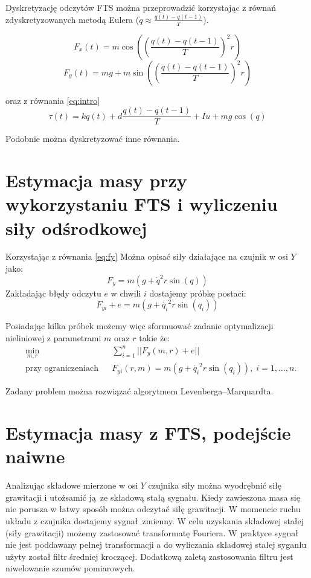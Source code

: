 \documentclass[a4paper, 10pt]{article}
\begin{document}
Dyskretyzację odczytów FTS można przeprowadzić korzystając z równań zdyskretyzowanych metodą Eulera ($\dot{q} \approx \frac{q(t)-q(t-1)}{T}$). 

\begin{equation}
F_x(t) = m\cos{((\frac{q(t)-q(t-1)}{T})^2 r)}
\end{equation}
\begin{equation}
\label{eq:fy}
F_y(t) = mg + m\sin{((\frac{q(t)-q(t-1)}{T})^2 r)}
\end{equation}

oraz z równania \ref{eq:intro}
\begin{equation}
\tau(t) = kq(t) + d\frac{q(t)-q(t-1)}{T} + Iu + mg\cos(q)
\end{equation}

Podobnie można dyskretyzować inne równania.
\section{Estymacja masy przy wykorzystaniu FTS i wyliczeniu siły odśrodkowej}
\label{sec:ftsods}
Korzystając z równania \ref{eq:fy} Można opisać siły działające na czujnik w osi $Y$ jako:
\begin{equation}
F_y  = m(g + \dot{q}^2r\sin{(q)})
\end{equation}
Zakładając błędy odczytu $e$ w chwili $i$ dostajemy próbkę postaci:
\begin{equation}
F_{yi}+e  = m(g + \dot{q_i}^2r\sin{(q_i)})
\end{equation}

Posiadając kilka próbek możemy więc sformuować zadanie optymalizacji nieliniowej z parametrami $m$ oraz $r$ takie że:
\begin{equation}
\begin{aligned}
& \underset{m, r}{\text{min}}
& & \sum_{i = 1}^{n} || F_y(m, r) + e || \\
& \text{przy ograniczeniach}
& & F_{yi}(r, m) = m(g + \dot{q_i}^2r\sin{(q_i)}), \; i = 1, \ldots, n.
\end{aligned}
\end{equation}

Zadany problem można rozwiązać algorytmem Levenberga–Marquardta.

\section{Estymacja masy z FTS, podejście naiwne}
\label{fts:nai}
Analizując składowe mierzone w osi $Y$ czujnika siły można wyodrębnić siłę grawitacji i utożsamić ją ze składową stałą sygnału. Kiedy zawieszona masa się nie porusza w łatwy sposób można odczytać siłę grawitacji. W momencie ruchu układu z czujnika dostajemy sygnał zmienny. W celu uzyskania składowej stałej (siły grawitacji) możemy zastosować transformatę Fouriera. W praktyce sygnał nie jest poddawany pełnej transformacji a do wyliczania składowej stałej syganłu użyty został filtr średniej kroczącej. Dodatkową zaletą zastosowania filtru jest niwelowanie szumów pomiarowych.
\end{document}
